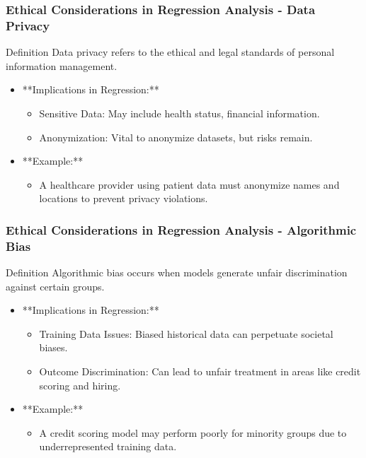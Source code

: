 \documentclass[aspectratio=169]{beamer}
\begin{document}
\begin{frame}[fragile]
    \frametitle{Ethical Considerations in Regression Analysis - Data Privacy}
    \begin{block}{Definition}
        Data privacy refers to the ethical and legal standards of personal information management.
    \end{block}
    \begin{itemize}
        \item **Implications in Regression:**
            \begin{itemize}
                \item Sensitive Data: May include health status, financial information.
                \item Anonymization: Vital to anonymize datasets, but risks remain.
            \end{itemize}
        \item **Example:**
            \begin{itemize}
                \item A healthcare provider using patient data must anonymize names and locations to prevent privacy violations.
            \end{itemize}
    \end{itemize}
\end{frame}

\begin{frame}[fragile]
    \frametitle{Ethical Considerations in Regression Analysis - Algorithmic Bias}
    \begin{block}{Definition}
        Algorithmic bias occurs when models generate unfair discrimination against certain groups.
    \end{block}
    \begin{itemize}
        \item **Implications in Regression:**
            \begin{itemize}
                \item Training Data Issues: Biased historical data can perpetuate societal biases.
                \item Outcome Discrimination: Can lead to unfair treatment in areas like credit scoring and hiring.
            \end{itemize}
        \item **Example:**
            \begin{itemize}
                \item A credit scoring model may perform poorly for minority groups due to underrepresented training data.
            \end{itemize}
    \end{itemize}
\end{frame}
\end{document}
